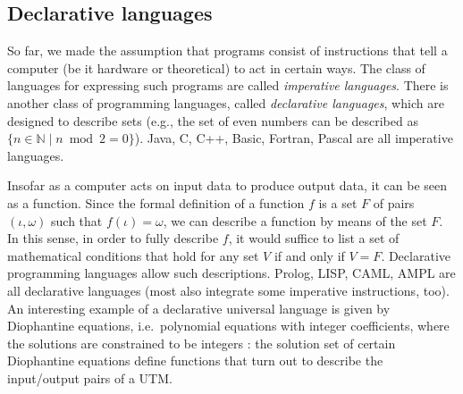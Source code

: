 \documentclass[a4paper]{book}
\theoremstyle{changebreak}                %
\begin{document}
\subsection{Declarative languages}
\label{s:computation:declarative}
So far, we made the assumption that programs consist of instructions
that tell a computer (be it hardware or theoretical) to act in certain
ways. The class of languages for expressing such programs are called
{\it imperative
  languages}. There is
another class of programming languages, called {\it declarative
  languages}, which are
designed to describe sets (e.g., the set of even numbers can be
described as $\{n\in\mathbb{N}\;|\;n\bmod 2 = 0\}$). Java,
C, C++, Basic,
Fortran, Pascal are all imperative
languages.

Insofar as a computer acts on input data to produce output data, it
can be seen as a function. Since the formal definition of a
function $f$ is a set $F$ of pairs $(\iota,\omega)$
such that $f(\iota)=\omega$, we can describe a function by means of
the set $F$. In this sense, in order to fully describe $f$, it would
suffice to list a set of mathematical conditions that hold for any set
$V$ if and only if $V=F$. Declarative programming
languages allow such descriptions. Prolog,
LISP, CAML, AMPL are all
declarative languages (most also integrate some imperative
instructions, too). An interesting example of a declarative universal
language is given by Diophantine
equations,
i.e.~polynomial equations with integer coefficients,
where the solutions are constrained to be integers \cite{jones}: the
solution set of certain Diophantine equations define functions that
turn out to describe the input/output pairs of a UTM.
\end{document}
